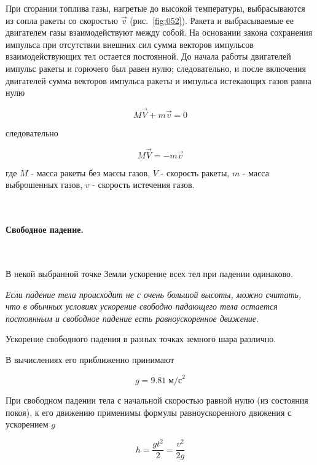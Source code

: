 \documentclass[a4paper,12pt]{article}
\begin{document}
		При сгорании топлива газы, нагретые до высокой температуры, выбрасываются 
		из сопла ракеты со скоростью $\vec{v}$ (рис.~\ref{fig:052}). Ракета и выбрасываемые 
		ее двигателем газы взаимодействуют между собой. На основании закона сохранения 
		импульса при отсутствии внешних сил сумма векторов импульсов взаимодействующих 
		тел остается постоянной. До начала работы двигателей импульс ракеты и горючего 
		был равен нулю; следовательно, и после включения двигателей сумма векторов 
		импульса ракеты и импульса истекающих газов равна нулю

		\begin{equation*}
			M \vec{V} + m \vec{v} = 0
		\end{equation*}

		следовательно

		\begin{equation*}
			M \vec{V} = -m \vec{v}
		\end{equation*}

		где $M$ - масса ракеты без массы газов, $V$ - скорость ракеты, $m$ - масса 
		выброшенных газов, $v$ - скорость истечения газов.


		\

		\paragraph{Свободное падение.} \
		
		В некой выбранной точке Земли ускорение всех тел при падении одинаково.

		\textit{Если падение тела происходит не с очень большой высоты, можно считать,
		что в обычных условиях ускорение свободно падающего тела остается
		постоянным и свободное падение есть равноускоренное движение.}

		Ускорение свободного падения в разных точках земного шара различно. 
		
		В вычислениях его приближенно принимают

		\begin{equation*}
			g = 9.81 \; \text{м/с}^2
		\end{equation*}
		
		При свободном падении тела с начальной скоростью равной нулю 
		(из состояния покоя), к его движению применимы формулы
		равноускоренного движения с ускорением $g$

		\begin{equation}
			h = \frac{gt^2}{2} = \frac{v^2}{2g}
		\end{equation}
\end{document}
